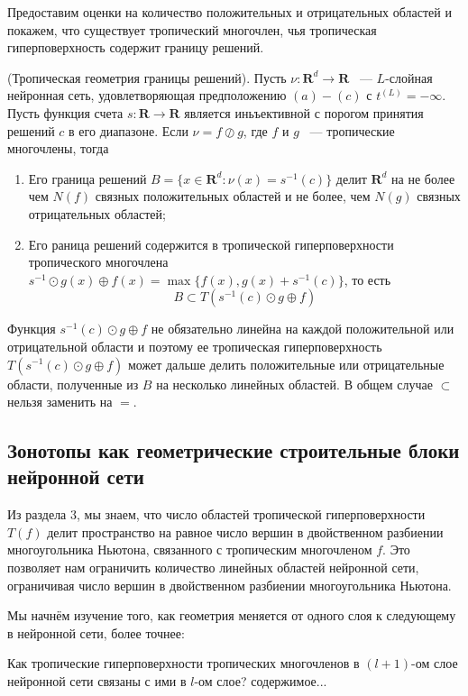 \documentclass[russian]{lecture-notes}
\begin{document}
	Предоставим оценки на количество положительных и отрицательных областей и покажем, что существует тропический многочлен, чья тропическая гиперповерхность содержит границу решений.
	\begin{Proposition}
		(Тропическая геометрия границы решений). Пусть $\nu : \mathbf{R}^d \rightarrow \mathbf{R}$  ~--- $L$-слойная нейронная сеть, удовлетворяющая предположению $(a)-(c)$ с $t^{(L)} = -\infty$. Пусть функция счета $s : \mathbf{R} \rightarrow \mathbf{R}$  является иньъективной с порогом принятия решений $c$ в его диапазоне. Если $\nu = f \oslash g$, где $f$ и $g$ ~--- тропические многочлены, тогда 
		\begin{enumerate}
			\item Его граница решений $B = \{x \in \mathbf{R}^d:\nu(x) = s^{-1}(c)\}$ делит $\mathbf{R}^d$ на не более чем $N(f)$ связных положительных областей и не более, чем $N(g)$ связных отрицательных областей;
			\item Его раница решений содержится в тропической гиперповерхности тропического многочлена $s^{-1}\odot g(x)\oplus f(x) = \max\{f(x),g(x)+s^{-1}(c)\}$, то есть 
				\[B 
				\subset T(s^{-1}(c)\odot g \oplus f)
				\]  
		\end{enumerate}
	
		Функция $s^{-1}(c) \odot g \oplus f$ не обязательно линейна на каждой положительной или отрицательной области и поэтому ее тропическая гиперповерхность $T(s^{-1}(c)\odot g \oplus f)$ может дальше делить положительные или отрицательные области, полученные из $B$ на несколько линейных областей. В общем случае $\subset$ нельзя заменить на $=$.
	\end{Proposition}

	\subsection{Зонотопы как геометрические строительные блоки нейронной сети}
	
	Из раздела 3, мы знаем, что число областей тропической гиперповерхности $T(f)$ делит пространство на равное число вершин в двойственном разбиении многоугольника Ньютона, связанного с тропическим многочленом $f$. Это позволяет нам ограничить количество линейных областей нейронной сети, ограничивая число вершин в двойственном разбиении многоугольника Ньютона. 
	
	Мы начнём изучение того, как геометрия меняется от одного слоя к следующему в нейронной сети, более точнее:
	
	\begin{Question}
		Как тропические гиперповерхности тропических многочленов в $(l + 1)$-ом слое нейронной сети связаны с ими в $l$-ом слое?
		содержимое...
	\end{Question}
	
\end{document}

